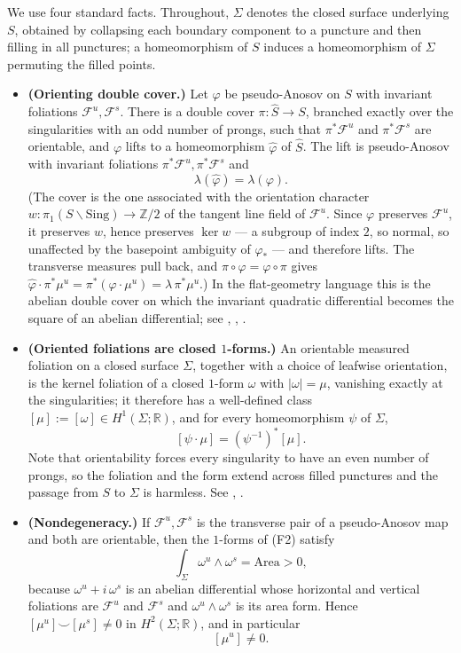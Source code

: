 \documentclass[11pt]{article}
\theoremstyle{plain}
\theoremstyle{definition}
\theoremstyle{remark}
\newcommand{\Fu}{\mathcal{F}^{u}}
\newcommand{\Fs}{\mathcal{F}^{s}}
\newcommand{\HH}{H^{1}}
\newcommand{\ZZ}{\mathbb{Z}}
\newcommand{\RR}{\mathbb{R}}
\begin{document}
We use four standard facts. Throughout, $\Sigma$ denotes the closed surface
underlying $S$, obtained by collapsing each boundary component to a puncture and
then filling in all punctures; a homeomorphism of $S$ induces a homeomorphism of
$\Sigma$ permuting the filled points.

\begin{itemize}
\item[(F1)] \textbf{(Orienting double cover.)} Let $\varphi$ be pseudo-Anosov on
$S$ with invariant foliations $\Fu,\Fs$. There is a double cover
$\pi\colon\widehat S\to S$, branched exactly over the singularities with an odd
number of prongs, such that $\pi^{*}\Fu$ and $\pi^{*}\Fs$ are orientable, and
$\varphi$ lifts to a homeomorphism $\widehat\varphi$ of $\widehat S$. The lift is
pseudo-Anosov with invariant foliations $\pi^{*}\Fu,\pi^{*}\Fs$ and
\[
  \lambda(\widehat\varphi)=\lambda(\varphi).
\]
(The cover is the one associated with the orientation character
$w\colon\pi_{1}(S\smallsetminus\mathrm{Sing})\to\ZZ/2$ of the tangent line field
of $\Fu$. Since $\varphi$ preserves $\Fu$, it preserves $w$, hence preserves
$\ker w$ --- a subgroup of index $2$, so normal, so unaffected by the basepoint
ambiguity of $\varphi_{*}$ --- and therefore lifts. The transverse measures pull
back, and $\pi\circ\widehat\varphi=\varphi\circ\pi$ gives
$\widehat\varphi\cdot\pi^{*}\mu^{u}=\pi^{*}(\varphi\cdot\mu^{u})
=\lambda\,\pi^{*}\mu^{u}$.) In the flat-geometry language this is the abelian
double cover on which the invariant quadratic differential becomes the square of
an abelian differential; see \cite[\S2]{Zorich}, \cite[Exp.~5, 9]{FLP},
\cite{Strenner}.

\item[(F2)] \textbf{(Oriented foliations are closed $1$-forms.)} An orientable
measured foliation on a closed surface $\Sigma$, together with a choice of leafwise
orientation, is the kernel foliation of a closed $1$-form $\omega$ with
$|\omega|=\mu$, vanishing exactly at the singularities; it therefore has a
well-defined class $[\mu]:=[\omega]\in\HH(\Sigma;\RR)$, and for every
homeomorphism $\psi$ of $\Sigma$,
\[
  [\psi\cdot\mu]=(\psi^{-1})^{*}[\mu].
\]
Note that orientability forces every singularity to have an even number of prongs,
so the foliation and the form extend across filled punctures and the passage from
$S$ to $\Sigma$ is harmless. See \cite[\S2]{Zorich}, \cite{FLP}.

\item[(F3)] \textbf{(Nondegeneracy.)} If $\Fu,\Fs$ is the transverse pair of a
pseudo-Anosov map and both are orientable, then the $1$-forms of (F2) satisfy
\[
  \int_{\Sigma}\omega^{u}\wedge\omega^{s}=\mathrm{Area}>0 ,
\]
because $\omega^{u}+i\,\omega^{s}$ is an abelian differential whose horizontal and
vertical foliations are $\Fu$ and $\Fs$ and $\omega^{u}\wedge\omega^{s}$ is its
area form. Hence $[\mu^{u}]\smile[\mu^{s}]\ne0$ in $H^{2}(\Sigma;\RR)$, and in
particular
\[
  [\mu^{u}]\ne0 .
\]


\end{itemize}
\end{document}
